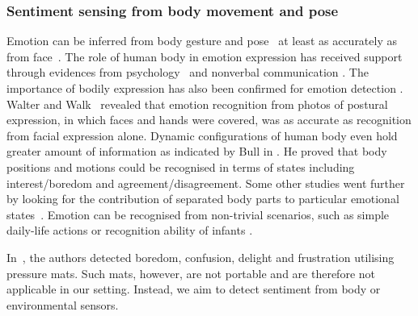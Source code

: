 \documentclass[12pt]{article}
\begin{document}
\subsubsection*{Sentiment sensing from body movement and pose}
Emotion can be inferred from body gesture and pose~\cite{Pervasive_Jaggarwal_2012} at least as accurately as from face~\cite{Emotion_Nguyen_2012,Emotion_Castellano_2008,Emotion_Meeren_2005}.
The role of human body in emotion expression has received support through evidences from psychology~\cite{Emotion_Walters_1986} and nonverbal communication \cite{Emotion_Dittmann_1978}. 
The importance of  bodily expression has also been confirmed for emotion detection \cite{Emotion_Wallbott_1998, Emotion_VanHeijnsbergen_2007,Emotion_Atkinson_2007}. 
Walter and Walk~\cite{Emotion_Walters_1986} revealed that emotion recognition from photos of postural expression, in which faces and hands were covered, was as accurate as recognition from facial expression alone.
Dynamic configurations of human body even hold greater amount of information as indicated by Bull in \cite{Emotion_Bull_1987}. 
He proved that body positions and motions could be recognised in terms of states including interest/boredom and agreement/disagreement. 
Some other studies went further by looking for the contribution of separated body parts to particular emotional states~\cite{Emotion_DeMeijer_1989,Emotion_Montepare_1999}.
Emotion can be recognised from non-trivial scenarios, such as simple daily-life actions \cite{Emotion_Crane_2007,Emotion_Bernhardt_2007} or recognition ability of infants \cite{Emotion_Lagerlof_2009}. 


In~\cite{SentimentSensing_Mota_2003,SentimentSesing_Mello_2009}, the authors detected boredom, confusion, delight and frustration utilising pressure mats. 
Such mats, however, are not portable and are therefore not applicable in our setting. 
Instead, we aim to detect sentiment from body or environmental sensors. 
\end{document}
